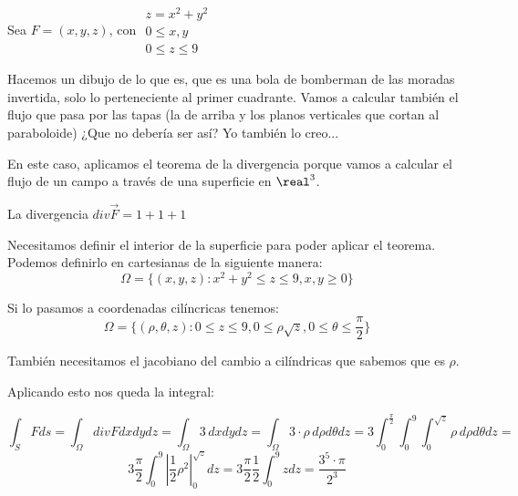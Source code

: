 \begin{problem}[17]
Sea $F = (x,y,z)$, con $\begin{array}{cc}
z = x^2+y^2\\
0\leq x,y\\
0\leq z\leq 9
\end{array}$

\solution
Hacemos un dibujo de lo que es, que es una bola de bomberman de las moradas invertida, solo lo perteneciente al primer cuadrante.
Vamos a calcular también el flujo que pasa por las tapas (la de arriba y los planos verticales que cortan al paraboloide) ¿Que no debería ser así? Yo también lo creo... 


En este caso, aplicamos el teorema de la divergencia porque vamos a calcular el flujo de un campo a través de una superficie en $\real^3$.

La divergencia $div \overrightarrow{F} = 1+1+1$

Necesitamos definir el interior de la superficie para poder aplicar el teorema. Podemos definirlo en cartesianas de la siguiente manera: \[\Omega = \{ (x,y,z): x^2+y^2\leq z\leq 9, x,y\geq 0\}\]

Si lo pasamos a coordenadas cilíncricas tenemos: \[\Omega = \{(\rho,\theta,z): 0\leq z\leq 9, 0\leq \rho \sqrt{z},0\leq\theta\leq\frac{\pi}{2}\}\]

También necesitamos el jacobiano del cambio a cilíndricas que sabemos que es $\rho$.

Aplicando esto nos queda la integral:

\[\int_S Fds =  \int_{\Omega} div F dxdydz = \int_{\Omega} 3\,dxdydz = \int_{\Omega}3\cdot\rho \,d\rho d\theta dz = 3 \int_0^{\frac{\pi}{2}} \int_0^9 \int_0^{\sqrt{z}} \rho\, d\rho d\theta dz =\]
\[
 3\frac{\pi}{2} \int_0^9 \left| \frac{1}{2} \rho^2\right|^{\sqrt{z}}_0 dz
 = 3\frac{\pi}{2} \frac{1}{2}\int_0^9 zdz = \frac{3^5\cdot \pi}{2^3}\]

\end{problem}

